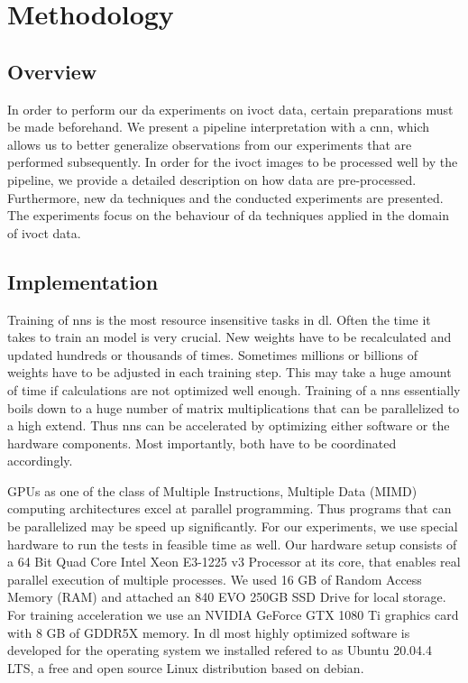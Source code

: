 \chapter{Methodology}

\section{Overview}

In order to perform our \acrshort{da} experiments on \acrshort{ivoct} data, certain preparations must be made beforehand. We present a pipeline interpretation with a \acrshort{cnn}, which allows us to better generalize observations from our experiments that are performed subsequently. In order for the \acrshort{ivoct} images to be processed well by the pipeline, we provide a detailed description on how data are pre-processed. Furthermore, new \acrshort{da} techniques and the conducted experiments are presented. The experiments focus on the behaviour of \acrshort{da} techniques applied in the domain of \acrshort{ivoct} data.

\section{Implementation}

Training of \acrshort{nn}s is the most resource insensitive tasks in \acrshort{dl}. Often the time it takes to train an model is very crucial. New weights have to be recalculated and updated hundreds or thousands of times. Sometimes millions or billions of weights have to be adjusted in each training step. This may take a huge amount of time if calculations are not optimized well enough. Training of a \acrshort{nn}s essentially boils down to a huge number of matrix multiplications that can be parallelized to a high extend. Thus \acrshort{nn}s can be accelerated by optimizing either software or the hardware components. Most importantly, both have to be coordinated accordingly.

GPUs as one of the class of Multiple Instructions, Multiple Data (MIMD) computing architectures excel at parallel programming. Thus programs that can be parallelized may be speed up significantly. For our experiments, we use special hardware to run the tests in feasible time as well. Our hardware setup consists of a 64 Bit Quad Core Intel Xeon E3-1225 v3 Processor at its core, that enables real parallel execution of multiple processes. We used 16 GB of Random Access Memory (RAM) and attached an 840 EVO 250GB SSD Drive for local storage. For training acceleration we use an NVIDIA GeForce GTX 1080 Ti graphics card with 8 GB of GDDR5X memory. In \acrshort{dl} most highly optimized software is developed for the operating system we installed refered to as Ubuntu 20.04.4 LTS, a free and open source Linux distribution based on \gls{debian}.

